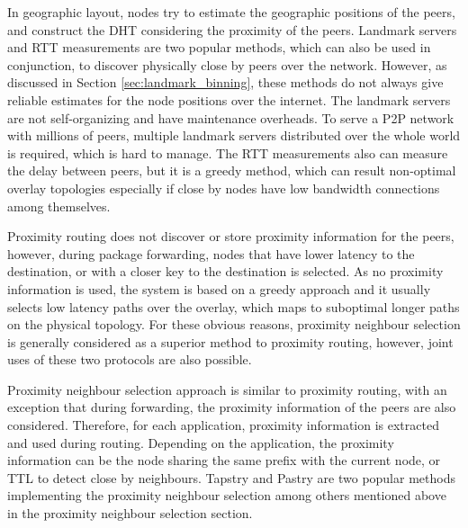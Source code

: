 \documentclass[acmcsur]{acmtrans2m}
\begin{document}
In geographic layout, nodes try to estimate the geographic positions of the
peers, and construct the DHT considering the proximity of the peers. Landmark
servers and RTT measurements are two popular methods, which can also be used in 
conjunction, to discover physically close by peers over the network. However, as
discussed in Section \ref{sec:landmark_binning}, these methods do not always
give reliable estimates for the node positions over the internet. The landmark
servers are not self-organizing and have maintenance overheads. To serve a
P2P network with millions of peers, multiple landmark servers
distributed over the whole world is required, which is hard to manage. The RTT
measurements also can measure the delay between peers, but it is a greedy method,
which can result non-optimal overlay topologies especially if close by nodes
have low bandwidth connections among themselves.

Proximity routing does not discover or store proximity information for the
peers, however, during package forwarding, nodes that have lower latency to the
destination, or with a closer key to the destination is selected. As no
proximity information is used, the system is based on a greedy approach and it
usually selects low latency paths over the overlay, which maps to suboptimal
longer paths on the physical topology. For these obvious reasons, proximity
neighbour selection is generally considered as a superior method to proximity
routing, however, joint uses of these two protocols are also possible.

Proximity neighbour selection approach is similar to proximity routing, with an
exception that during forwarding, the proximity information of the peers are
also considered. Therefore, for each application, proximity information is
extracted and used during routing. Depending on the application, the proximity
information can be the node sharing the same prefix with the current node, or
TTL to detect close by neighbours. Tapstry and Pastry are two popular methods
implementing the proximity neighbour selection among others mentioned above in the
proximity neighbour selection section.
\end{document}
